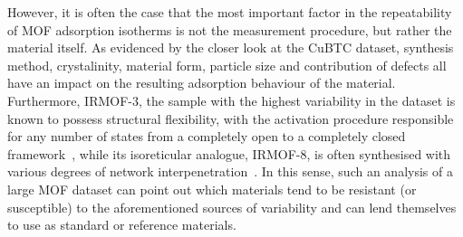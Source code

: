 However, it is often the case that the most important factor
in the repeatability of MOF adsorption isotherms
is not the measurement procedure, but rather the material itself.
As evidenced by the closer look at the CuBTC dataset, synthesis
method, crystalinity, material form, particle size and contribution
of defects all have an impact on the resulting adsorption behaviour
of the material. Furthermore, IRMOF-3, the sample with the 
highest variability in the dataset is known to possess structural
flexibility, with the activation procedure responsible for 
any number of states from a completely open to a completely closed
framework~\cite{nelsonSupercriticalProcessingRoute2009}, while its
isoreticular analogue, IRMOF-8, is often synthesised with various 
degrees of network
interpenetration~\cite{feldblyumNoninterpenetratedIRMOF8Synthesis2012}. 
In this sense, such an analysis of a large MOF dataset can point out 
which materials tend to be resistant (or susceptible) to the 
aforementioned sources of variability 
and can lend themselves to use as standard or reference materials.